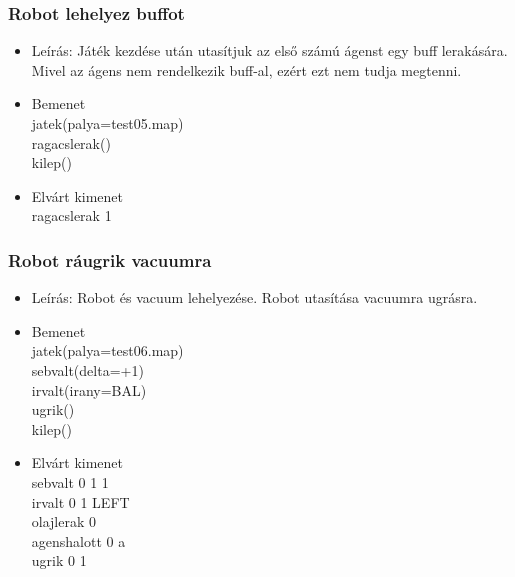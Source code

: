 \subsubsection{Robot lehelyez buffot}
\begin{itemize}
	\item Leírás: Játék kezdése után utasítjuk az első számú ágenst egy buff lerakására. Mivel az ágens nem rendelkezik buff-al, ezért ezt nem tudja megtenni.
	\item Bemenet\\	
    jatek(palya=test05.map)\\
    ragacslerak()\\
    kilep()\\
	\item Elvárt kimenet\\
    ragacslerak 1 \\
    
		
\end{itemize}

\subsubsection{Robot ráugrik vacuumra}
\begin{itemize}
	\item Leírás: Robot és vacuum lehelyezése. Robot utasítása vacuumra ugrásra.
	\item Bemenet\\
    jatek(palya=test06.map)\\
    sebvalt(delta=+1)\\
    irvalt(irany=BAL)\\
    ugrik()\\
    kilep()\\
	\item Elvárt kimenet\\
    sebvalt 0 1 1 \\
    irvalt 0 1 LEFT \\
    olajlerak 0 \\ 
    agenshalott 0 a \\
    ugrik 0 1 \\
    

\end{itemize}

